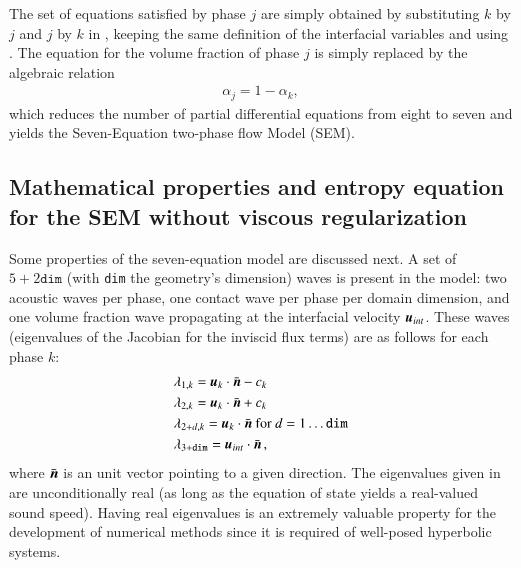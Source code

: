 \documentclass[preprint,10pt]{elsarticle}
\begin{document}

The set of equations satisfied by phase $j$ are simply obtained by substituting $k$ by $j$ and $j$ by $k$ in , keeping 
the same definition of the interfacial variables and using . The equation for the volume fraction of phase $j$ is simply replaced by the algebraic relation
%
\begin{align}
 \alpha_{j}= 1 - \alpha_{k}, \nonumber
\end{align}
%
which reduces the number of partial differential equations from eight to seven and yields the Seven-Equation two-phase flow Model (SEM). 

\subsection{Mathematical properties and entropy equation for the SEM without viscous regularization}\label{eq:sem-ent-wv}
Some properties of the seven-equation model are discussed next. A set of $5+2\texttt{dim}$ (with \texttt{dim} the geometry's dimension) waves 
is present in the model: two acoustic waves per phase, one contact wave per phase per domain dimension, and one volume fraction wave propagating 
at the interfacial velocity $\boldsymbol u_{int}$. These waves (eigenvalues of the Jacobian for the inviscid flux terms) are as follows for each phase $k$:
% 
\begin{align}\label{eq:eigenvalues}
&\lambda_{1,k} = \boldsymbol u_k \cdot \bar{\boldsymbol n} - c_k \nonumber\\
&\lambda_{2,k} = \boldsymbol u_k \cdot \bar{\boldsymbol n} + c_k \nonumber\\
&\lambda_{2+d,k} = \boldsymbol u_k \cdot \bar{\boldsymbol n} \text{ for } d = 1 \dots \texttt{dim} \\
&\lambda_{3+\texttt{dim}} = \boldsymbol u_{int} \cdot \bar{\boldsymbol n} \nonumber \,,
\end{align}
%
where $\bar{\boldsymbol n}$ is an unit vector pointing to a given direction. The eigenvalues given in  are unconditionally 
real (as long as the equation of state yields a real-valued sound speed). Having real eigenvalues is an extremely valuable property for 
the development of numerical methods since it is required of well-posed hyperbolic systems. 
\end{document}
